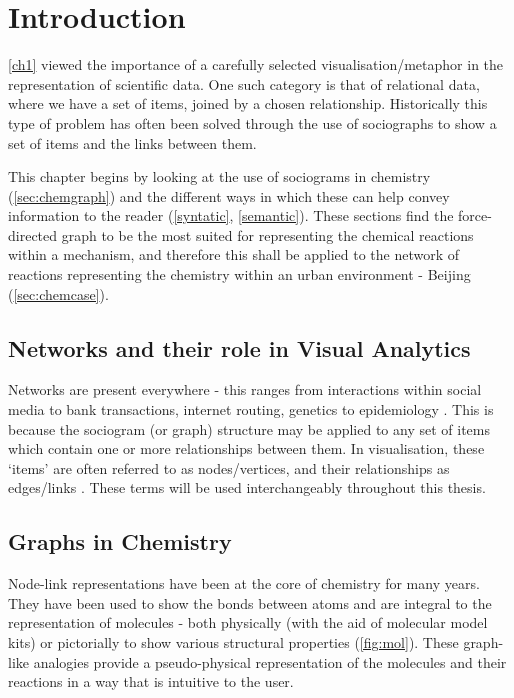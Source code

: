 
\section{Introduction}
\autoref{ch1} viewed the importance of a carefully selected visualisation/metaphor in the representation of scientific data. One such category is that of relational data, where we have a set of items, joined by a chosen relationship. Historically
this type of problem has often been solved through the use of sociographs to show a set of items and the links between them. 

This chapter begins by looking at the use of sociograms in chemistry (\autoref{sec:chemgraph}) and the different ways in which these can help convey information to the reader (\autoref{syntatic}, \autoref{semantic}). These sections find the force-directed graph to be the most suited for representing the chemical reactions within a mechanism, and therefore this shall be applied to the network of reactions representing the chemistry within an urban environment - Beijing (\autoref{sec:chemcase}).


\subsection{Networks and their role in Visual Analytics} \label{sec:va}
Networks are present everywhere - this ranges from interactions within social media to bank transactions, internet routing, genetics to epidemiology \citep{worldmap, epidim,neoj4,netneuro,prbank,ch4,ch8,ch9}. This is because the sociogram (or graph) structure may be applied to any set of items which contain one or more relationships between them. In visualisation, these `items' are often referred to as nodes/vertices, and their relationships as edges/links \citep{ch1}. These terms will be used interchangeably throughout this thesis. 


\subsection{Graphs in Chemistry}\label{sec:chemgraph}
Node-link representations have been at the core of chemistry for many years. They have been used to show the bonds between atoms and are integral to the representation of molecules - both physically (with the aid of molecular model kits) or pictorially to show various structural properties (\autoref{fig:mol}). These graph-like analogies provide a pseudo-physical representation of the molecules and their reactions in a way that is intuitive to the user. 



